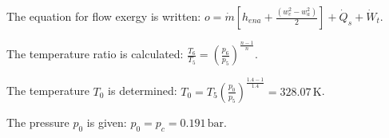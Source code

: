 The equation for flow exergy is written:  
\( o = \dot{m} \left[ h_{ena} + \frac{(w_e^2 - w_a^2)}{2} \right] + \dot{Q}_s + \dot{W}_t \).  

The temperature ratio is calculated:  
\( \frac{T_6}{T_5} = \left( \frac{p_6}{p_5} \right)^{\frac{n-1}{n}} \).  

The temperature \( T_0 \) is determined:  
\( T_0 = T_5 \left( \frac{p_0}{p_5} \right)^{\frac{1.4-1}{1.4}} = 328.07 \, \text{K} \).  

The pressure \( p_0 \) is given:  
\( p_0 = p_c = 0.191 \, \text{bar} \).